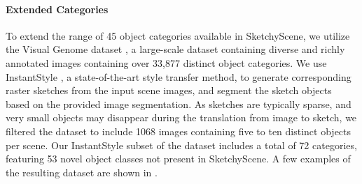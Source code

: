 \paragraph{Extended Categories}
To extend the range of 45 object categories available in SketchyScene, we utilize the Visual Genome dataset \cite{VisualGenome2017}, a large-scale dataset containing diverse and richly annotated images containing over 33,877 distinct object categories. 
We use InstantStyle \cite{Wang2024InstantStyleFL}, a state-of-the-art style transfer method, to generate corresponding raster sketches from the input scene images, and segment the sketch objects based on the provided image segmentation. As sketches are typically sparse, and very small objects may disappear during the translation from image to sketch, we filtered the dataset to include 1068 images containing five to ten distinct objects per scene. Our InstantStyle subset of the \datasetname{} dataset includes a total of 72 categories, featuring 53 novel object classes not present in SketchyScene. A few examples of the resulting dataset are shown in .












